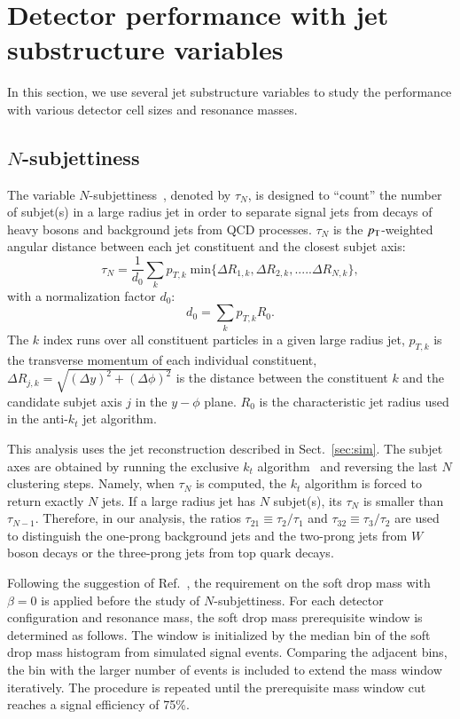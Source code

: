 \section{Detector performance with jet substructure variables}\label{sec:Jsubvar}
In this section, we use several jet substructure variables to study the performance with various detector cell sizes and resonance masses.

\subsection{$N$-subjettiness \label{sec:nsub}}
The variable $N$-subjettiness~\cite{Thaler:2010tr}, denoted by $\tau_N$, is designed to 
``count'' the number of subjet(s) in a large radius jet in order to separate 
signal jets from decays of heavy bosons and background jets from QCD processes. 
 $\tau_N$ is the $p_{\mathrm{T}}$-weighted angular distance between each jet 
constituent and the closest subjet axis: 
\begin{equation}\label{eq:Nsub_1}
\tau_{N}=\frac{1}{d_{0}}\sum_{k}p_{T,k} \; \mathrm{min}\{\Delta R_{1,k},\Delta R_{2,k},.....\Delta R_{N,k}\},
\end{equation}
with a normalization factor $d_0$: \[d_{0}=\sum_{k}p_{T,k} R_{0}.\] 
The $k$ index runs over all constituent particles in a given large radius jet, 
$p_{T,k}$ is the transverse momentum of each individual constituent, 
$\Delta R_{j,k}=\sqrt{(\Delta y)^{2}+(\Delta \phi)^{2}}$ is the distance 
between the constituent $k$ and the candidate subjet axis $j$ in the 
$y-\phi$ plane. $R_{0}$ is the characteristic jet radius used in 
the anti-$k_t$ jet algorithm. 

This analysis uses the jet reconstruction described in Sect.~\ref{sec:sim}. 
The subjet axes are obtained by running the 
exclusive $k_{t}$ algorithm~\cite{Catani:246812} and reversing the last $N$ clustering steps. 
Namely, when $\tau_N$ is computed, the $k_{t}$ algorithm is forced to return 
exactly $N$ jets. If a large radius jet has $N$ subjet(s), its $\tau_{N}$ is 
smaller than $\tau_{N-1}$. Therefore, in our analysis, 
the ratios $\tau_{21} \equiv \tau_{2}/\tau_{1}$ and $\tau_{32} \equiv \tau_{3}/\tau_{2}$ 
are used to distinguish the one-prong background jets and 
the two-prong jets from $W$ boson decays or the three-prong jets from top quark decays. 

Following the suggestion of Ref.~\cite{Dreyer:2018tjj}, the requirement on the 
soft drop mass with $\beta=0$ is applied before the study of $N$-subjettiness. 
For each detector configuration and resonance mass, the soft drop mass prerequisite window  
is determined as follows. The window is initialized by the median bin of the soft drop 
mass histogram from simulated signal events. Comparing the adjacent bins, the bin with the larger number of events is included to extend the mass window iteratively. The procedure is 
repeated until the prerequisite mass window cut reaches a signal  efficiency of 75\%.

